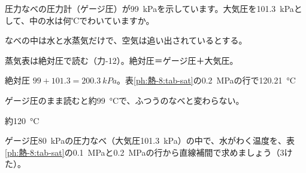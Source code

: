 \begin{reidai}[圧力なべの中の温度]
\label{ph:熱-8:ex13}圧力なべの圧力計（ゲージ圧）が\qty{99}{kPa}を示しています。大気圧を\qty{101.3}{kPa}として、中の水は何℃でわいていますか。
\par{} なべの中は水と水蒸気だけで、空気は追い出されているとする。
\par\kangaekata 蒸気表は絶対圧で読む（力-12）。絶対圧＝ゲージ圧＋大気圧。
\par\shiki 絶対圧 $99+101.3=\qty{200.3}{kPa}$。表\ref{ph:熱-8:tab-sat}の\qty{0.2}{MPa}の行で\qty{120.21}{\celsius}
\par{} ゲージ圧のまま読むと約\qty{99}{\celsius}で、ふつうのなべと変わらない。
\par\kotae 約\qty{120}{\celsius}
\end{reidai}
\begin{jibun}
ゲージ圧\qty{80}{kPa}の圧力なべ（大気圧\qty{101.3}{kPa}）の中で、水がわく温度を、表\ref{ph:熱-8:tab-sat}の\qty{0.1}{MPa}と\qty{0.2}{MPa}の行から直線補間で求めましょう（3けた）。
\end{jibun}


